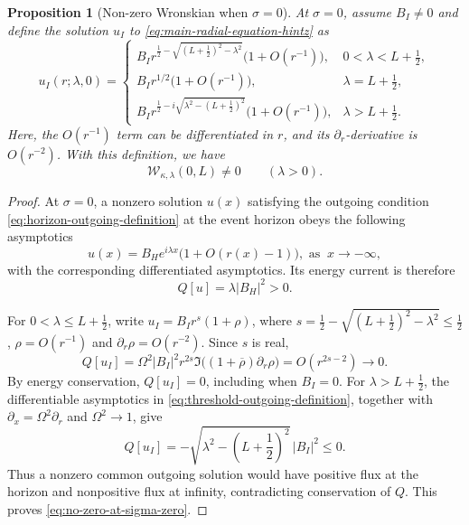 \documentclass[11pt]{article}
\numberwithin{equation}{section}
\newtheorem{proposition}[theorem]{Proposition}
\begin{document}
	
	\begin{proposition}[Non-zero Wronskian when $\sigma=0$]
		\label{prop:sigma-zero-threshold}
		At $\sigma=0$, assume $B_I \ne 0$ and define the solution $u_I$ to {\eqref{eq:main-radial-equation-hintz}} as
		\begin{equation}
			u_I(r;\lambda,0)=
			\begin{cases}
				B_I r^{\frac12-\sqrt{(L+\frac12)^2-\lambda^2}}
				\bigl(1+O(r^{-1})\bigr),&0<\lambda<L+\frac12,\\[1mm]
				B_I r^{1/2}\bigl(1+O(r^{-1})\bigr),&\lambda=L+\frac12,\\[1mm]
				B_I r^{\frac12-i\sqrt{\lambda^2-(L+\frac12)^2}}
				\bigl(1+O(r^{-1})\bigr),&\lambda>L+\frac12.
			\end{cases}
			\label{eq:threshold-outgoing-definition}
		\end{equation}
		Here, the $O(r^{-1})$ term can be differentiated in $r$, and its $\partial_r$-derivative is  $O(r^{-2})$. With this definition, we have
		\begin{equation}
			\mathcal W_{\kappa,\lambda}(0,L)\neq0\qquad(\lambda>0).
			\label{eq:no-zero-at-sigma-zero}
		\end{equation}
	\end{proposition}
	
	\begin{proof}
		At $\sigma=0$, a nonzero solution  $u(x)$ satisfying the outgoing condition \eqref{eq:horizon-outgoing-definition} at the event horizon obeys the following asymptotics
		\begin{equation}
			u(x)=B_H e^{i\lambda x}\bigl(1+O(r(x)-1)\bigr), \text{ as }
			\ x\to-\infty,
			\label{eq:sigma-zero-horizon-asymptotic}
		\end{equation}
		with the corresponding differentiated asymptotics. Its energy current is
		therefore
		\begin{equation}
			Q[u]=\lambda|B_H|^2>0.
			\label{eq:sigma-zero-horizon-current}
		\end{equation}
		
		
		For $0<\lambda\leq L+\frac12$, write
		$u_I=B_Ir^s(1+\rho)$, where
		$s=\frac12-\sqrt{(L+\frac12)^2-\lambda^2}\leq\frac12$,
		$\rho=O(r^{-1})$ and $\partial_r\rho=O(r^{-2})$.
		Since $s$ is real,
		\[
		Q[u_I]
		=\Omega^2|B_I|^2r^{2s}
		\Im\bigl((1+\overline\rho)\partial_r\rho\bigr)
		=O(r^{2s-2})\longrightarrow0.
		\]
		By energy conservation, $Q[u_I]=0$, including when $B_I=0$.
		For $\lambda>L+\frac12$, the differentiable
		asymptotics in \eqref{eq:threshold-outgoing-definition}, together
		with $\partial_x=\Omega^2\partial_r$ and
		$\Omega^2\to1$, give
		\begin{equation}
			Q[u_I]
			=-\sqrt{\lambda^2-(L+\frac12)^2}\,|B_I|^2\leq0.
			\label{eq:sigma-zero-infinity-current}
		\end{equation}
		Thus a nonzero common outgoing solution would have positive flux
		at the horizon and nonpositive flux at infinity, contradicting
		conservation of $Q$. This proves
		\eqref{eq:no-zero-at-sigma-zero}.
	\end{proof}
	
\end{document}
